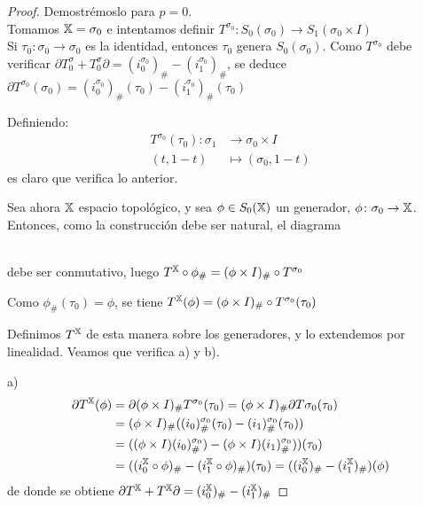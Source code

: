 \begin{proof}
  Demostrémoslo para $p = 0$. \\
  Tomamos ${\mathbb X} = \sigma_0$ e intentamos definir $T^{\sigma_0} \colon S_0(\sigma_0) \to S_1(\sigma_0 \times I)$ \\
  Si $\tau_0 \colon \sigma_0 \to \sigma_0$ es la identidad, entonces $\tau_0$ genera $S_0(\sigma_0)$. Como $T^{\sigma_0}$
  debe verificar $\partial T^\sigma_0 + T^\sigma_0 \partial = (i_0^{\sigma_0})_\# - (i_1^{\sigma_0})_\#$, se deduce
  $\partial T^{\sigma_0}(\sigma_0) = (i_0^{\sigma_0})_\# (\tau_0) - (i_1^{\sigma_0})_\# (\tau_0)$

  Definiendo:
  \begin{align*}
    T^{\sigma_0}(\tau_0) \colon \sigma_1 &\to \sigma_0 \times I \\
                       (t, 1-t) &\mapsto (\sigma_0, 1-t)
  \end{align*}
  es claro que verifica lo anterior.

  Sea ahora ${\mathbb X}$ espacio topológico, y sea $\phi \in S_0({\mathbb X})$ un generador, $\phi \colon \sigma_0 \to {\mathbb X}$.
  Entonces, como la construcción debe ser natural, el diagrama \\
   \\
  debe ser conmutativo, luego $T^{\mathbb X} \circ \phi_\# = (\phi \times I)_\# \circ T^{\sigma_0}$

  Como $\phi_\#(\tau_0) = \phi$, se tiene $T^{\mathbb X}(\phi) = (\phi \times I)_\# \circ T^{\sigma_0}(\tau_0)$

  Definimos $T^{\mathbb X}$ de esta manera sobre los generadores, y lo extendemos por linealidad. Veamos que verifica a) y b).

  a)
  \begin{align*}
    \partial T^{\mathbb X}(\phi) &= \partial(\phi \times I)_\# T^{\sigma_0}(\tau_0) = (\phi \times I)_\# \partial T{ \sigma_0}(\tau_0) \\
                        &= (\phi \times I)_\# ((i_0)_\#^{\sigma_0}(\tau_0) - (i_1)_\#^{\sigma_0}(\tau_0)) \\
                        &= ((\phi \times I) (i_0)_\#^{\sigma_0}) - (\phi \times I) (i_1)_\#^{\sigma_0}))(\tau_0) \\
                        &= ((i_0^{\mathbb X} \circ \phi)_\# - (i_1^{\mathbb X} \circ \phi)_\#) (\tau_0) = ((i_0^{\mathbb X})_\# - (i_1^{\mathbb X})_\#)(\phi)
  \end{align*}
  de donde se obtiene $\partial T^{\mathbb X} + T^{\mathbb X} \partial = (i_0^{\mathbb X})_\# - (i_1^{\mathbb X})_\#$


\end{proof}
